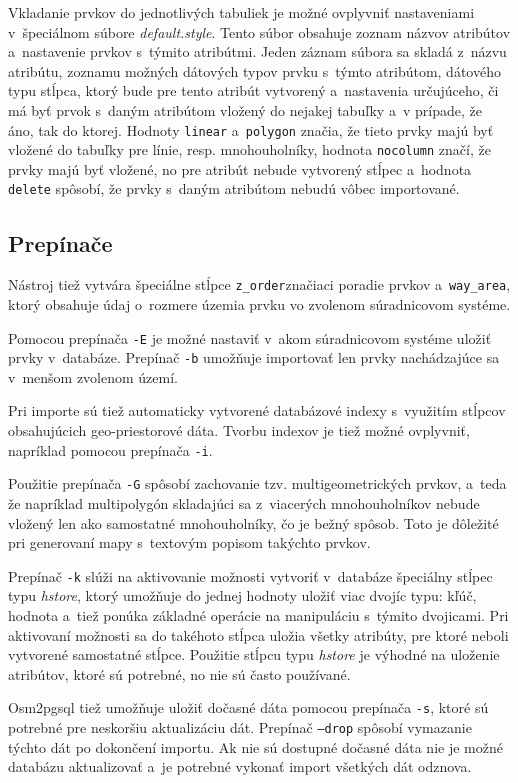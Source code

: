 Vkladanie prvkov do jednotlivých tabuliek je možné ovplyvniť nastaveniami v~špeciálnom súbore {\it default.style}. Tento súbor obsahuje zoznam názvov atribútov a~nastavenie prvkov s~týmito atribútmi. Jeden záznam súbora sa skladá z~názvu atribútu, zoznamu možných dátových typov prvku s~týmto atribútom, dátového typu stĺpca, ktorý bude pre tento atribút vytvorený a~nastavenia určujúceho, či má byť prvok s~daným atribútom vložený do nejakej tabuľky a~v prípade, že áno, tak do ktorej. Hodnoty {\tt linear} a~{\tt polygon} značia, že tieto prvky majú byť vložené do tabuľky pre línie, resp. mnohouholníky, hodnota {\tt nocolumn} značí, že prvky majú byť vložené, no pre atribút nebude vytvorený stĺpec a~hodnota {\tt delete} spôsobí, že prvky s~daným atribútom nebudú vôbec importované.

\subsection*{Prepínače}
Nástroj tiež vytvára špeciálne stĺpce {\tt z\_order}značiaci poradie prvkov a~{\tt way\_area}, ktorý obsahuje údaj o~rozmere územia prvku vo zvolenom súradnicovom systéme.

Pomocou prepínača {\tt -E} je možné nastaviť v~akom súradnicovom systéme uložiť prvky v~databáze. Prepínač {\tt -b} umožňuje importovať len prvky nachádzajúce sa v~menšom zvolenom území. 

Pri importe sú tiež automaticky vytvorené databázové indexy s~využitím stĺpcov obsahujúcich geo-priestorové dáta. Tvorbu indexov je tiež možné ovplyvniť, napríklad pomocou prepínača {\tt -i}.

Použitie prepínača {\tt -G} spôsobí zachovanie tzv. multigeometrických prvkov, a~teda že napríklad multipolygón skladajúci sa z~viacerých mnohouholníkov nebude vložený len ako samostatné mnohouholníky, čo je bežný spôsob. Toto je dôležité pri generovaní mapy s~textovým popisom takýchto prvkov.

Prepínač {\tt -k} slúži na aktivovanie možnosti vytvoriť v~databáze špeciálny stĺpec typu {\it hstore}, ktorý umožňuje do jednej hodnoty uložiť viac dvojíc typu: kľúč, hodnota a~tiež ponúka základné operácie na manipuláciu s~týmito dvojicami. Pri aktivovaní možnosti sa do takéhoto stĺpca uložia všetky atribúty, pre ktoré neboli vytvorené samostatné stĺpce. Použitie stĺpcu typu {\it hstore} je výhodné na uloženie atribútov, ktoré sú potrebné, no nie sú často používané.

Osm2pgsql tiež umožňuje uložiť dočasné dáta pomocou prepínača {\tt -s}, ktoré sú potrebné pre neskoršiu aktualizáciu dát. Prepínač {\tt --drop} spôsobí vymazanie týchto dát po dokončení importu. Ak nie sú dostupné dočasné dáta nie je možné databázu aktualizovať a~je potrebné vykonať import všetkých dát odznova.

